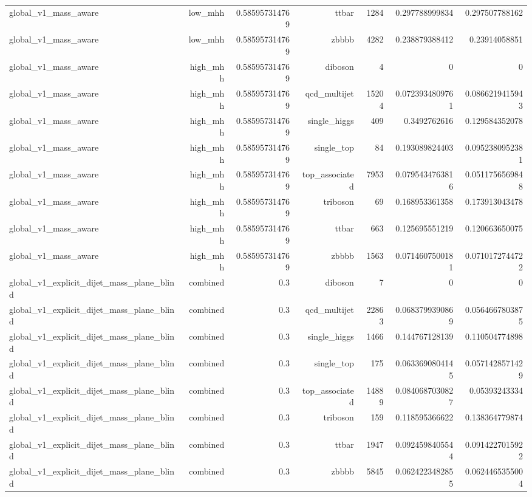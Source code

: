 \begin{table}[htbp]
{\begin{tabular}{lrrrrrr}
global\_v1\_mass\_aware & low\_mhh & 0.585957314769 & ttbar & 1284 & 0.297788999834 & 0.297507788162 \\
global\_v1\_mass\_aware & low\_mhh & 0.585957314769 & zbbbb & 4282 & 0.238879388412 & 0.23914058851 \\
global\_v1\_mass\_aware & high\_mhh & 0.585957314769 & diboson & 4 & 0 & 0 \\
global\_v1\_mass\_aware & high\_mhh & 0.585957314769 & qcd\_multijet & 15204 & 0.0723934809761 & 0.0866219415943 \\
global\_v1\_mass\_aware & high\_mhh & 0.585957314769 & single\_higgs & 409 & 0.3492762616 & 0.129584352078 \\
global\_v1\_mass\_aware & high\_mhh & 0.585957314769 & single\_top & 84 & 0.193089824403 & 0.0952380952381 \\
global\_v1\_mass\_aware & high\_mhh & 0.585957314769 & top\_associated & 7953 & 0.0795434763816 & 0.0511756569848 \\
global\_v1\_mass\_aware & high\_mhh & 0.585957314769 & triboson & 69 & 0.168953361358 & 0.173913043478 \\
global\_v1\_mass\_aware & high\_mhh & 0.585957314769 & ttbar & 663 & 0.125695551219 & 0.120663650075 \\
global\_v1\_mass\_aware & high\_mhh & 0.585957314769 & zbbbb & 1563 & 0.0714607500181 & 0.0710172744722 \\
global\_v1\_explicit\_dijet\_mass\_plane\_blind & combined & 0.3 & diboson & 7 & 0 & 0 \\
global\_v1\_explicit\_dijet\_mass\_plane\_blind & combined & 0.3 & qcd\_multijet & 22863 & 0.0683799390869 & 0.0564667803875 \\
global\_v1\_explicit\_dijet\_mass\_plane\_blind & combined & 0.3 & single\_higgs & 1466 & 0.144767128139 & 0.110504774898 \\
global\_v1\_explicit\_dijet\_mass\_plane\_blind & combined & 0.3 & single\_top & 175 & 0.0633690804145 & 0.0571428571429 \\
global\_v1\_explicit\_dijet\_mass\_plane\_blind & combined & 0.3 & top\_associated & 14889 & 0.0840687030827 & 0.05393243334 \\
global\_v1\_explicit\_dijet\_mass\_plane\_blind & combined & 0.3 & triboson & 159 & 0.118595366622 & 0.138364779874 \\
global\_v1\_explicit\_dijet\_mass\_plane\_blind & combined & 0.3 & ttbar & 1947 & 0.0924598405544 & 0.0914227015922 \\
global\_v1\_explicit\_dijet\_mass\_plane\_blind & combined & 0.3 & zbbbb & 5845 & 0.0624223482855 & 0.0624465355004 \\

\end{tabular}}
\end{table}
